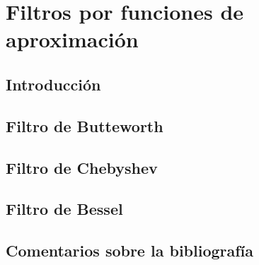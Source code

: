 \documentclass[oneside,a4paper,10pt]{scrbook}
\begin{document}
	\clearpage
   
	\chapter{Filtros por funciones de aproximación}
	{
		\section{Introducción}
   		{
    					
		}
		
		\clearpage
		
    	\section{Filtro de Butteworth}
   		{
    							
		}
		
		\clearpage
		
		\section[]{Filtro de Chebyshev}
   		{
    			
		}
		
		\clearpage
		
		\section{Filtro de Bessel}
   		{
    				
		}
		
		\clearpage
		
		\section{Comentarios sobre la bibliografía}
   		{
    						
		}
		
		\clearpage		
		
			
%			
	}
	
	\clearpage
	
\end{document}
